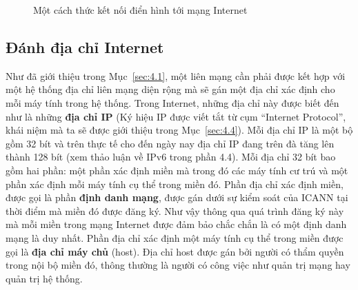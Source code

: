 \begin{figure}[bth] 
  \centering {}
  \caption{ Một cách thức kết nối điển hình tới mạng Internet}
  \label{fig:fig4.7}
\end{figure}

\subsection*{Đánh địa chỉ Internet}
Như đã giới thiệu trong Mục~\ref{sec:4.1}, một liên mạng cần phải được kết hợp với một hệ
thống địa chỉ liên mạng diện rộng mà sẽ gán một địa chỉ xác định cho mỗi máy tính trong hệ
thống. Trong Internet, những địa chỉ này được biết đến như là những \textbf{địa chỉ IP}
(Ký hiệu IP được viết tắt từ cụm “Internet Protocol”, khái niệm mà ta sẽ được giới thiệu
trong Mục~\ref{sec:4.4}). Mỗi địa chỉ IP là một bộ gồm 32 bít và trên thực tế cho đến ngày
nay địa chỉ IP đang trên đà tăng lên thành 128 bít (xem thảo luận về IPv6 trong phần
4.4). Mỗi địa chỉ 32 bít bao gồm hai phần: một phần xác định miền mà trong đó các máy tính
cư trú và một phần xác định mỗi máy tính cụ thể trong miền đó. Phần địa chỉ xác định miền,
được gọi là phần \textbf{định danh mạng}, được gán dưới sự kiểm soát của ICANN tại thời
điểm mà miền đó được đăng ký. Như vậy thông qua quá trình đăng ký này mà mỗi miền trong
mạng Internet được đảm bảo chắc chắn là có một định danh mạng là duy nhất. Phần địa chỉ
xác định một máy tính cụ thể trong miền được gọi là \textbf{địa chỉ máy chủ} (host). Địa
chỉ host được gán bởi người có thẩm quyền trong nội bộ miền đó, thông thường là người có
công việc như quản trị mạng hay quản trị hệ thống.

